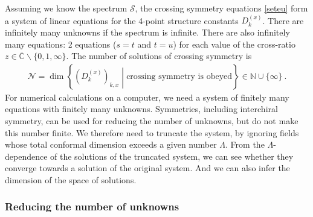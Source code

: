 \documentclass[12pt, a4paper]{article}
\theoremstyle{break}
\begin{document}
Assuming we know the spectrum $\mathcal{S}$, the 
crossing symmetry equations \eqref{seteu} form a system of linear equations for the 4-point structure constants $D^{(x)}_k$. There are infinitely many unknowns if the spectrum is infinite. There are also infinitely many equations: 2 equations ($s=t$ and $t=u$) for each value of the cross-ratio $z\in \overline{\mathbb{C}}\backslash\{0,1,\infty\}$. The number of solutions of crossing symmetry is 
\begin{align}
 \mathcal{N} = \dim\left\{\left(D^{(x)}_k\right)_{k,x}\middle|\text{crossing symmetry is obeyed}\right\}\in \mathbb{N}\cup \{\infty\}\ . 
 \label{nsol}
\end{align}
For numerical calculations on a computer, we need a system of finitely many equations with finitely many unknowns. Symmetries, including interchiral symmetry, can be used for reducing the number of unknowns, but do not make this number finite. We therefore need to truncate the system, by ignoring fields whose total conformal dimension exceeds a given number $\Lambda$. From the $\Lambda$-dependence of the solutions of the truncated system, we can see whether they converge towards a solution of the original system. And we can also infer the dimension of the space of solutions. 

\subsubsection{Reducing the number of unknowns}
\end{document}
